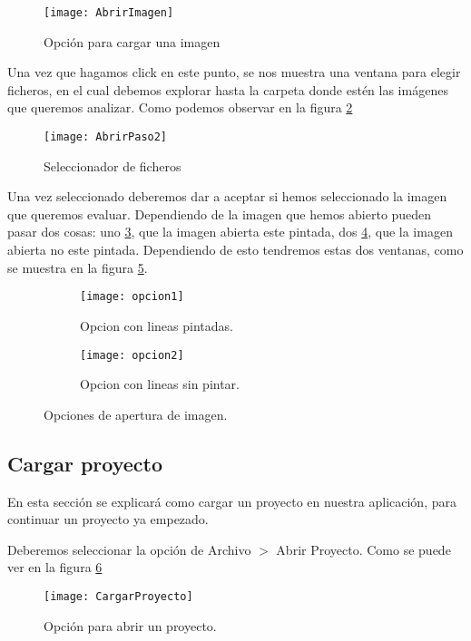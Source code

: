 \begin{figure}[h]
\centering
\texttt{[image: AbrirImagen]}
\caption{Opción para cargar una imagen}
\label{fig:abrirPro}
\end{figure}

Una vez que hagamos click en este punto, se nos muestra una ventana para elegir ficheros, en el cual debemos explorar hasta la carpeta donde estén las imágenes que queremos analizar. Como podemos observar en la figura \ref{fig:abrirPaso2}

\begin{figure}[h]
\centering
\texttt{[image: AbrirPaso2]}
\caption{Seleccionador de ficheros}
\label{fig:abrirPaso2}
\end{figure}

Una vez seleccionado deberemos dar a aceptar si hemos seleccionado la imagen que queremos evaluar.
Dependiendo de la imagen que hemos abierto pueden pasar dos cosas: uno \ref{fig:opcion1}, que la imagen abierta este pintada, dos \ref{fig:opcion2}, que la imagen abierta no este pintada. Dependiendo de esto tendremos estas dos ventanas, como se muestra en la figura \ref{fig:figuraTipos}.


\begin{figure}
	\begin{subfigure}[c]{.55\linewidth}
	\centering\large \texttt{[image: opcion1]}
	\caption{Opcion con lineas pintadas.}\label{fig:opcion1}
	\end{subfigure}%
	\begin{subfigure}[c]{.55\linewidth}
	\centering\large \texttt{[image: opcion2]}
	\caption{Opcion con lineas sin pintar.}\label{fig:opcion2}
	\end{subfigure}%
	\label{fig:figuraTipos}
	\caption{Opciones de apertura de imagen.}
\end{figure}




\subsection{Cargar proyecto}
\label{modo:2}

En esta sección se explicará como cargar un proyecto en nuestra aplicación, para continuar un proyecto ya empezado.

Deberemos seleccionar la opción de Archivo  $>$ Abrir Proyecto. Como se puede ver en la figura \ref{fig:cargarPro}


\begin{figure}[h]
\centering
\texttt{[image: CargarProyecto]}
\caption{Opción para abrir un proyecto.}
\label{fig:cargarPro}
\end{figure}

